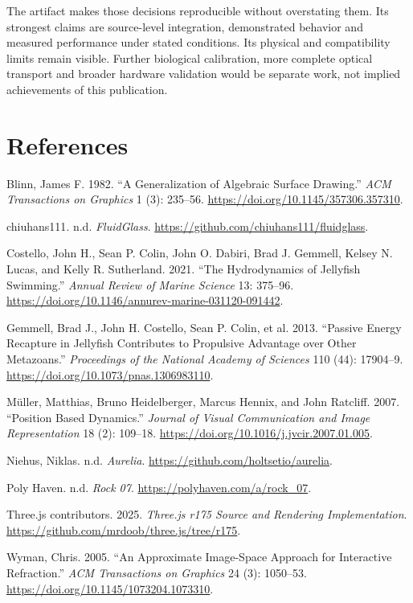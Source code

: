 \documentclass[
  english,
  11pt,
]{article}
\newlength{\cslhangindent}
\newenvironment{CSLReferences}[2] %
 {\begin{list}{}{%
  \setlength{\itemindent}{0pt}
  \setlength{\leftmargin}{0pt}
  \setlength{\parsep}{0pt}
  \ifodd #1
   \setlength{\leftmargin}{\cslhangindent}
   \setlength{\itemindent}{-1\cslhangindent}
  \fi
  \setlength{\itemsep}{#2\baselineskip}}}
 {\end{list}}
\begin{document}
The artifact makes those decisions reproducible without overstating
them. Its strongest claims are source-level integration, demonstrated
behavior and measured performance under stated conditions. Its physical
and compatibility limits remain visible. Further biological calibration,
more complete optical transport and broader hardware validation would be
separate work, not implied achievements of this publication.

\section{References}\label{references}

\protect{}\label{refs}
\begin{CSLReferences}{1}{1}
Blinn, James F. 1982. {``A Generalization of Algebraic Surface
Drawing.''} \emph{ACM Transactions on Graphics} 1 (3): 235--56.
\url{https://doi.org/10.1145/357306.357310}.

{chiuhans111}. n.d. \emph{FluidGlass}.
\url{https://github.com/chiuhans111/fluidglass}.

Costello, John H., Sean P. Colin, John O. Dabiri, Brad J. Gemmell,
Kelsey N. Lucas, and Kelly R. Sutherland. 2021. {``The Hydrodynamics of
Jellyfish Swimming.''} \emph{Annual Review of Marine Science} 13:
375--96. \url{https://doi.org/10.1146/annurev-marine-031120-091442}.

Gemmell, Brad J., John H. Costello, Sean P. Colin, et al. 2013.
{``Passive Energy Recapture in Jellyfish Contributes to Propulsive
Advantage over Other Metazoans.''} \emph{Proceedings of the National
Academy of Sciences} 110 (44): 17904--9.
\url{https://doi.org/10.1073/pnas.1306983110}.

Müller, Matthias, Bruno Heidelberger, Marcus Hennix, and John Ratcliff.
2007. {``Position Based Dynamics.''} \emph{Journal of Visual
Communication and Image Representation} 18 (2): 109--18.
\url{https://doi.org/10.1016/j.jvcir.2007.01.005}.

Niehus, Niklas. n.d. \emph{Aurelia}.
\url{https://github.com/holtsetio/aurelia}.

Poly Haven. n.d. \emph{Rock 07}. \url{https://polyhaven.com/a/rock_07}.

Three.js contributors. 2025. \emph{{Three.js r175} Source and Rendering
Implementation}. \url{https://github.com/mrdoob/three.js/tree/r175}.

Wyman, Chris. 2005. {``An Approximate Image-Space Approach for
Interactive Refraction.''} \emph{ACM Transactions on Graphics} 24 (3):
1050--53. \url{https://doi.org/10.1145/1073204.1073310}.

\end{CSLReferences}
\end{document}
